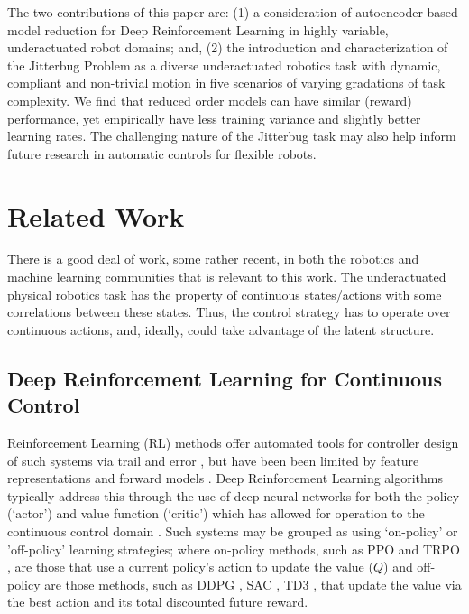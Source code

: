 \documentclass[letterpaper, 10 pt, conference]{ieeeconf}
\begin{document}
The two contributions of this paper are: (1) a consideration of autoencoder-based model reduction for Deep Reinforcement Learning in highly variable, underactuated robot domains; and, (2) the introduction and characterization of the Jitterbug Problem as a diverse underactuated robotics task with dynamic, compliant and non-trivial motion in five scenarios of varying gradations of task complexity.
We find that reduced order models can have similar (reward) performance, yet empirically have less training variance and slightly better learning rates.  
The challenging nature of the Jitterbug task may also help inform future research in automatic controls for flexible robots.


\section{Related Work}

There is a good deal of work, some rather recent, in both the robotics and machine learning communities that is relevant to this work.  The underactuated physical robotics task has the property of continuous states/actions with some correlations between these states.   Thus, the control strategy has to operate over continuous actions, and, ideally, could take advantage of the latent structure. 

\subsection{Deep Reinforcement Learning for Continuous Control}

Reinforcement Learning (RL) methods offer automated tools for controller design of such systems via trail and error \cite{sutton1998reinforcement}, but have been been limited by feature representations and forward models \cite{duan2016benchmarking}. 
Deep Reinforcement Learning algorithms typically address this through the use of deep neural networks for both the policy (`actor') and value function (`critic') which has allowed for operation to the continuous control domain \cite{mnih2015human, DDPG}. 
Such systems may be grouped as using `on-policy' or 'off-policy' learning strategies; where on-policy methods, such as PPO \cite{PPO} and TRPO \cite{TRPO}, are those that use a current policy's action to update the value ($Q$) and off-policy are those methods, such as DDPG \cite{DDPG}, SAC \cite{SAC}, TD3 \cite{TD3}, that update the value via the best action and its total discounted future reward.  
\end{document}
